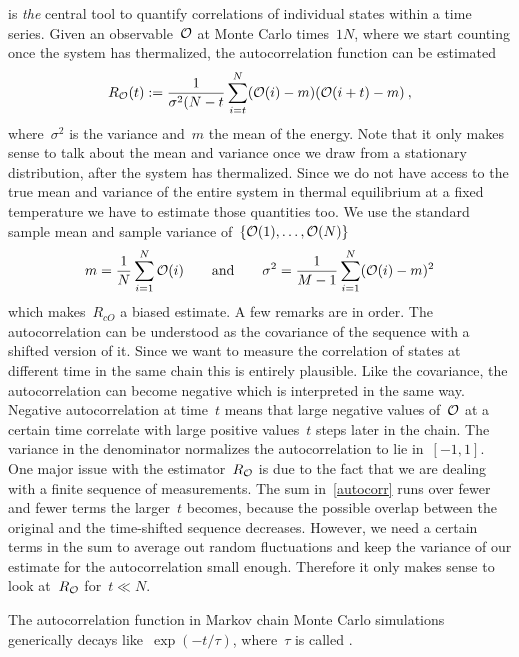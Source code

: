 is \emph{the} central tool to quantify correlations of
individual states within a time series. Given an observable~$\mathcal{O}$ at Monte Carlo
times~$\numlist{1}{N}$, where we start counting once the system has thermalized,
the autocorrelation function can be estimated
%
\begin{equation}
  R_{\mathcal{O}}(t) := \frac{1}{\sigma^2 (N-t} \sum_{i = t}^{N}
    (\mathcal{O}(i) - m) (\mathcal{O}(i+t) - m)\:,
\end{equation}
%
where~$\sigma^2$ is the variance and~$m$ the mean of the energy. Note that it
only makes sense to talk about the mean and variance once we draw from a
stationary distribution, \ie{} after the system has thermalized.  Since we do
not have access to the true mean and variance of the entire system in thermal
equilibrium at a fixed temperature we have to estimate those quantities too. We
use the standard sample mean and sample variance of~$\{\mathcal{O}(1),\dots,\mathcal{O}(N)\}$
%
\begin{equation}\label{autocorr}
  m = \frac{1}{N} \sum_{i=1}^N \mathcal{O}(i) \qquad\text{and}\qquad
  \sigma^2 = \frac{1}{M-1} \sum_{i=1}^N (\mathcal{O}(i) - m)^2
\end{equation}
%
which makes~$R_{cO}$ a biased estimate. A few remarks are in order. The
autocorrelation can be understood as the covariance of the sequence with a
shifted version of it. Since we want to measure the correlation of states at
different time in the same chain this is entirely plausible. Like the
covariance, the autocorrelation can become negative which is interpreted in the
same way. Negative autocorrelation at time~$t$ means that large negative values
of~$\mathcal{O}$ at a certain time correlate with large positive values~$t$ steps later
in the chain. The variance in the denominator normalizes the autocorrelation to
lie in~$[-1,1]$. One major issue with the estimator~$R_{\mathcal{O}}$ is due to the fact
that we are dealing with a finite sequence of measurements. The sum
in~\eqref{autocorr} runs over fewer and fewer terms the larger~$t$ becomes,
because the possible overlap between the original and the time-shifted sequence
decreases. However, we need a certain terms in the sum to average out random
fluctuations and keep the variance of our estimate for the autocorrelation small
enough. Therefore it only makes sense to look at~$R_{\mathcal{O}}$ for~$t \ll N$.

The autocorrelation function in Markov chain Monte Carlo simulations generically
decays like~$\exp(-t/\tau)$, where~$\tau$ is called .

